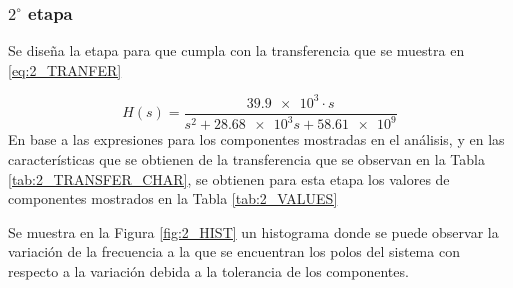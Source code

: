 \subsubsection{$2^\circ$ etapa}
Se dise\~na la etapa para que cumpla con la transferencia que se muestra en \ref{eq:2_TRANFER}

\begin{equation}
    H(s) = \frac{\num{39.9e3}\cdot s}{s^2 + \num{28.68e3}s + \num{58.61e9}}
    \label{eq:1_TRANFER}
\end{equation}
En base a las expresiones para los componentes mostradas en el an\'alisis, y en las caracter\'isticas que se obtienen de la transferencia que se observan en la Tabla \ref{tab:2_TRANSFER_CHAR}, se obtienen para esta etapa los valores de componentes mostrados en la Tabla \ref{tab:2_VALUES}
\begin{table}[H]
    \centering
    \caption{Caracter\'isticas de la segunda etapa}
    \label{tab:2_TRANSFER_CHAR}
\end{table}
\begin{table}[H]
    \centering
    \caption{Valores de componentes para la segunda etapa}
    \label{tab:2_VALUES}
\end{table}
Se muestra en la Figura \ref{fig:2_HIST} un histograma donde se puede observar la variaci\'on de la frecuencia a la que se encuentran los polos del sistema con respecto a la variaci\'on debida a la tolerancia de los componentes.
